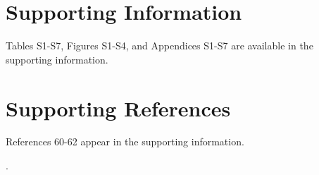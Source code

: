 \documentclass[12pt]{article}
\begin{document}
\section*{Supporting Information}

Tables S1-S7, Figures S1-S4, and Appendices S1-S7 are available in the supporting information.  

\section*{Supporting References}

References 60-62 appear in the supporting information.

\nocite{chodera2012}
\nocite{crooks2007beyond}
\nocite{chodera2012}
\nocite{jaynes1957information}
\nocite{rozycki2011saxs}.  
\nocite{relative_entropy_wiki}
\nocite{rubin1981}
\nocite{flyvbjerg1989error}
\nocite{shirts2008}


\clearpage
\end{document}
